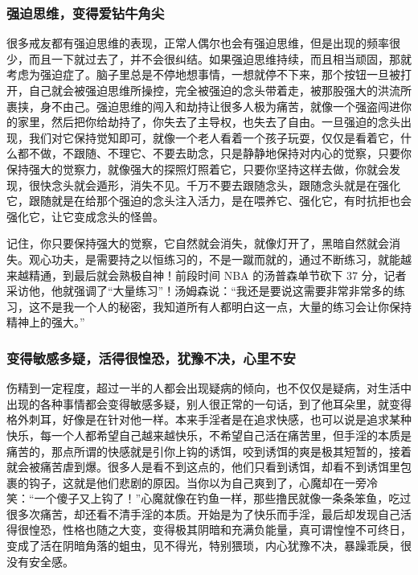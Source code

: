 \subsubsection{强迫思维，变得爱钻牛角尖}

很多戒友都有强迫思维的表现，正常人偶尔也会有强迫思维，但是出现的频率很少，而且一下就过去了，并不会很纠结。如果强迫思维持续，而且相当顽固，那就考虑为强迫症了。脑子里总是不停地想事情，一想就停不下来，那个按钮一旦被打开，自己就会被强迫思维所操控，完全被强迫的念头带着走，被那股强大的洪流所裹挟，身不由己。强迫思维的闯入和劫持让很多人极为痛苦，就像一个强盗闯进你的家里，然后把你给劫持了，你失去了主导权，也失去了自由。一旦强迫的念头出现，我们对它保持觉知即可，就像一个老人看着一个孩子玩耍，仅仅是看着它，什么都不做，不跟随、不理它、不要去助念，只是静静地保持对内心的觉察，只要你保持强大的觉察力，就像强大的探照灯照着它，只要你坚持这样去做，你就会发现，很快念头就会遁形，消失不见。千万不要去跟随念头，跟随念头就是在强化它，跟随就是在给那个强迫的念头注入活力，是在喂养它、强化它，有时抗拒也会强化它，让它变成念头的怪兽。

记住，你只要保持强大的觉察，它自然就会消失，就像灯开了，黑暗自然就会消失。观心功夫，是需要持之以恒练习的，不是一蹴而就的，通过不断练习，就能越来越精通，到最后就会熟极自神！前段时间 NBA 的汤普森单节砍下 37 分，记者采访他，他就强调了“大量练习”！汤姆森说：“我还是要说这需要非常非常多的练习，这不是我一个人的秘密，我知道所有人都明白这一点，大量的练习会让你保持精神上的强大。”

\subsubsection{变得敏感多疑，活得很惶恐，犹豫不决，心里不安}

伤精到一定程度，超过一半的人都会出现疑病的倾向，也不仅仅是疑病，对生活中出现的各种事情都会变得敏感多疑，别人很正常的一句话，到了他耳朵里，就变得格外刺耳，好像是在针对他一样。本来手淫者是在追求快感，也可以说是追求某种快乐，每一个人都希望自己越来越快乐，不希望自己活在痛苦里，但手淫的本质是痛苦的，那点所谓的快感就是引你上钩的诱饵，咬到诱饵的爽是极其短暂的，接着就会被痛苦虐到爆。很多人是看不到这点的，他们只看到诱饵，却看不到诱饵里包裹的钩子，这就是他们悲剧的原因。当你以为自己爽到了，心魔却在一旁冷笑：“一个傻子又上钩了！”心魔就像在钓鱼一样，那些撸民就像一条条笨鱼，吃过很多次痛苦，却还看不清手淫的本质。开始是为了快乐而手淫，最后却发现自己活得很惶恐，性格也随之大变，变得极其阴暗和充满负能量，真可谓惶惶不可终日，变成了活在阴暗角落的蛆虫，见不得光，特别猥琐，内心犹豫不决，暴躁乖戾，很没有安全感。


